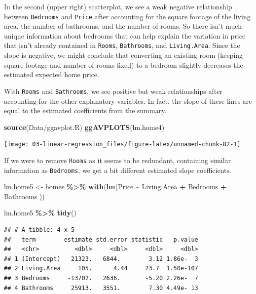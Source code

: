 \documentclass[
]{book}
\newenvironment{Shaded}{\begin{snugshade}}{\end{snugshade}}
\newcommand{\FunctionTok}[1]{\textcolor[rgb]{0.13,0.29,0.53}{\textbf{#1}}}
\newcommand{\NormalTok}[1]{#1}
\newcommand{\OtherTok}[1]{\textcolor[rgb]{0.56,0.35,0.01}{#1}}
\newcommand{\SpecialCharTok}[1]{\textcolor[rgb]{0.81,0.36,0.00}{\textbf{#1}}}
\newcommand{\StringTok}[1]{\textcolor[rgb]{0.31,0.60,0.02}{#1}}
\begin{document}
In the second (upper right) scatterplot, we see a weak negative relationship between \texttt{Bedrooms} and \texttt{Price} after accounting for the square footage of the living area, the number of bathrooms, and the number of rooms. So there isn't much unique information about bedrooms that can help explain the variation in price that isn't already contained in \texttt{Rooms}, \texttt{Bathrooms}, and \texttt{Living.Area}. Since the slope is negative, we might conclude that converting an existing room (keeping square footage and number of rooms fixed) to a bedroom slightly decreases the estimated expected home price.

With \texttt{Rooms} and \texttt{Bathrooms}, we see positive but weak relationships after accounting for the other explanatory variables. In fact, the slope of these lines are equal to the estimated coefficients from the summary.

\begin{Shaded}
\begin{Highlighting}[]
\FunctionTok{source}\NormalTok{(}\StringTok{\textquotesingle{}Data/ggavplot.R\textquotesingle{}}\NormalTok{)}
\FunctionTok{ggAVPLOTS}\NormalTok{(lm.home4)}
\end{Highlighting}
\end{Shaded}

\begin{center}\texttt{[image: 03-linear-regression\_files/figure-latex/unnamed-chunk-82-1]} \end{center}

If we were to remove \texttt{Rooms} as it seems to be redundant, containing similar information as \texttt{Bedrooms}, we get a bit different estimated slope coefficients.

\begin{Shaded}
\begin{Highlighting}[]
\NormalTok{lm.home5 }\OtherTok{\textless{}{-}}\NormalTok{ homes }\SpecialCharTok{\%\textgreater{}\%} 
  \FunctionTok{with}\NormalTok{(}\FunctionTok{lm}\NormalTok{(Price }\SpecialCharTok{\textasciitilde{}}\NormalTok{ Living.Area }\SpecialCharTok{+}\NormalTok{ Bedrooms }\SpecialCharTok{+}\NormalTok{ Bathrooms ))}

\NormalTok{lm.home5 }\SpecialCharTok{\%\textgreater{}\%} 
  \FunctionTok{tidy}\NormalTok{()}
\end{Highlighting}
\end{Shaded}

\begin{verbatim}
## # A tibble: 4 x 5
##   term        estimate std.error statistic   p.value
##   <chr>          <dbl>     <dbl>     <dbl>     <dbl>
## 1 (Intercept)   21323.   6844.        3.12 1.86e-  3
## 2 Living.Area     105.      4.44     23.7  1.50e-107
## 3 Bedrooms     -13702.   2636.       -5.20 2.26e-  7
## 4 Bathrooms     25913.   3551.        7.30 4.49e- 13
\end{verbatim}
\end{document}

